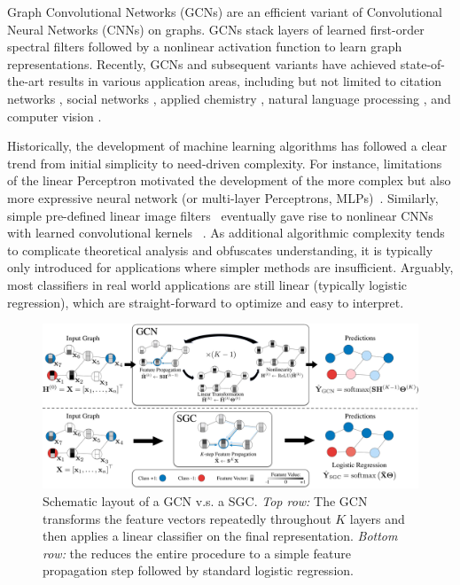 Graph Convolutional Networks (GCNs) \cite{gcn} are an efficient variant of Convolutional Neural Networks (CNNs) on graphs. 
GCNs stack layers of learned first-order spectral filters followed by a nonlinear activation function to learn graph representations.
Recently, GCNs and subsequent variants have achieved state-of-the-art results in various application areas, including but not limited to citation networks \cite{gcn}, social networks \cite{FastGCN}, applied chemistry \cite{liao2018lanczosnet}, natural language processing \cite{textGCN, han2012geolocation, relation-extraction}, and computer vision \cite{wang2018zero, ADGPM}.  

Historically, the development of machine learning algorithms has followed a clear trend from initial simplicity to need-driven complexity. For instance, limitations of the linear Perceptron \cite{rosenblatt1958perceptron} motivated the development of the more complex but also more expressive neural network (or multi-layer Perceptrons, MLPs)~\cite{rosenblatt1961principles}. Similarly, simple pre-defined linear image filters~\cite{sobel19683x3,harris1988combined} eventually gave rise to nonlinear CNNs with learned convolutional kernels ~\cite{waibel1989phoneme,lecun1989backpropagation}. 
As additional algorithmic complexity tends to complicate theoretical analysis and obfuscates understanding, it is typically only introduced  for applications where simpler methods are insufficient.  Arguably, most classifiers in real world applications are still linear (typically logistic regression), which are straight-forward to optimize and easy to interpret. 

% 

\begin{figure}[h!]
    \centering
    \includegraphics[width=1.0\linewidth]{figures/gcn5.pdf}
    \caption{Schematic layout of a GCN v.s. a SGC. \textit{Top row:} The GCN  transforms the feature vectors repeatedly throughout $K$ layers and then applies a linear classifier on the final representation. \textit{Bottom row:}  the \method{} reduces the entire procedure to a simple feature propagation step followed by standard logistic regression. }
    \label{fig:method}
\end{figure}

